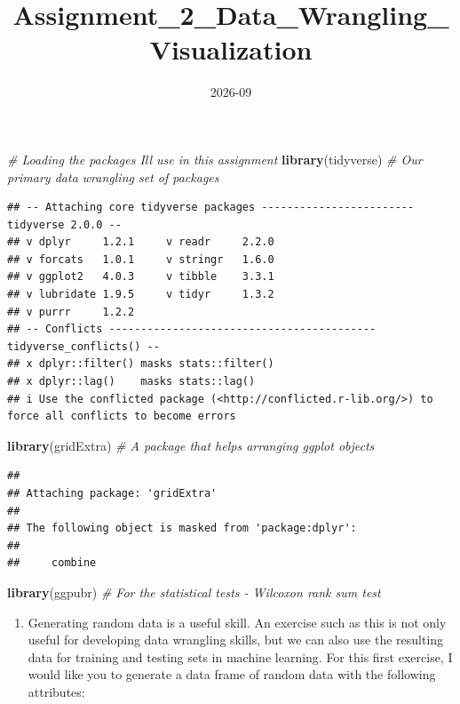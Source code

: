 \documentclass[
]{article}
\title{Assignment\_2\_Data\_Wrangling\_Visualization}
\author{}
\date{\vspace{-2.5em}2026-09}
\newenvironment{Shaded}{\begin{snugshade}}{\end{snugshade}}
\newcommand{\CommentTok}[1]{\textcolor[rgb]{0.56,0.35,0.01}{\textit{#1}}}
\newcommand{\FunctionTok}[1]{\textcolor[rgb]{0.13,0.29,0.53}{\textbf{#1}}}
\newcommand{\NormalTok}[1]{#1}
\providecommand{\tightlist}{%
  \setlength{\itemsep}{0pt}\setlength{\parskip}{0pt}}
\begin{document}
\maketitle

\begin{Shaded}
\begin{Highlighting}[]
\CommentTok{\# Loading the packages I\textquotesingle{}ll use in this assignment}
\FunctionTok{library}\NormalTok{(tidyverse) }\CommentTok{\# Our primary data wrangling set of packages}
\end{Highlighting}
\end{Shaded}

\begin{verbatim}
## -- Attaching core tidyverse packages ------------------------ tidyverse 2.0.0 --
## v dplyr     1.2.1     v readr     2.2.0
## v forcats   1.0.1     v stringr   1.6.0
## v ggplot2   4.0.3     v tibble    3.3.1
## v lubridate 1.9.5     v tidyr     1.3.2
## v purrr     1.2.2     
## -- Conflicts ------------------------------------------ tidyverse_conflicts() --
## x dplyr::filter() masks stats::filter()
## x dplyr::lag()    masks stats::lag()
## i Use the conflicted package (<http://conflicted.r-lib.org/>) to force all conflicts to become errors
\end{verbatim}

\begin{Shaded}
\begin{Highlighting}[]
\FunctionTok{library}\NormalTok{(gridExtra) }\CommentTok{\# A package that helps arranging ggplot objects}
\end{Highlighting}
\end{Shaded}

\begin{verbatim}
## 
## Attaching package: 'gridExtra'
## 
## The following object is masked from 'package:dplyr':
## 
##     combine
\end{verbatim}

\begin{Shaded}
\begin{Highlighting}[]
\FunctionTok{library}\NormalTok{(ggpubr) }\CommentTok{\# For the statistical tests {-} Wilcoxon rank sum test}
\end{Highlighting}
\end{Shaded}

\begin{enumerate}
\def\labelenumi{\arabic{enumi})}
\tightlist
\item
  Generating random data is a useful skill. An exercise such as this is
  not only useful for developing data wrangling skills, but we can also
  use the resulting data for training and testing sets in machine
  learning. For this first exercise, I would like you to generate a data
  frame of random data with the following attributes:
\end{enumerate}
\end{document}
